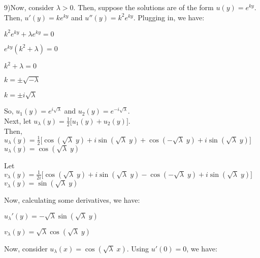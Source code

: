 \documentclass[12pt, executivepaper]{article}
\begin{document}
\begin{flushleft}

9)Now, consider $\lambda > 0$. Then, suppose the solutions are of the form $u(y)=e^{ky}$. Then, $u'(y)=ke^{ky}$ and $u''(y)=k^2e^{ky}$. Plugging in, we have: 

\begin{center}

$k^2e^{ky}+ \lambda e^{ky}=0$

$e^{ky}(k^2+ \lambda)=0$

$k^2+ \lambda=0$

$k=\pm \sqrt{-\lambda}$

$k=\pm i \sqrt{\lambda}$

\end{center}

So, $u_{1}(y)=e^{i \sqrt{\lambda}}$ and $u_{2}(y)=e^{-i \sqrt{\lambda}}$. \\

Next, let $u_{\lambda}(y)=\frac{1}{2}\bigg[u_{1}(y)+u_{2}(y)\bigg]$. \\

Then, \\ 
$u_{\lambda}(y)=\frac{1}{2}\bigg[\cos(\sqrt{\lambda} \; y)+i\sin(\sqrt{\lambda} \; y)+\cos(-\sqrt{\lambda} \; y)+i\sin(\sqrt{\lambda} \; y)\bigg]$ \\

$u_{\lambda}(y)=\cos(\sqrt{\lambda} \; y)$

\vspace{3mm}

Let $v_{\lambda}(y)=\frac{1}{2i}\bigg[\cos(\sqrt{\lambda} \; y)+i\sin(\sqrt{\lambda} \; y)-\cos(-\sqrt{\lambda} \; y)+i\sin(\sqrt{\lambda} \; y)\bigg]$ \\

$v_{\lambda}(y)=\sin(\sqrt{\lambda} \; y)$

\vspace{3mm}

Now, calculating some derivatives, we have:

\begin{center}

$u_{\lambda}'(y)=-\sqrt{\lambda}\sin(\sqrt{\lambda} \; y)$

$v_{\lambda}(y)=\sqrt{\lambda}\cos(\sqrt{\lambda} \; y)$

\end{center}

Now, consider $u_{\lambda}(x)=\cos(\sqrt{\lambda} \; x)$. Using $u'(0)=0$, we have:

\begin{center}


\end{center}
\end{flushleft}
\end{document}
